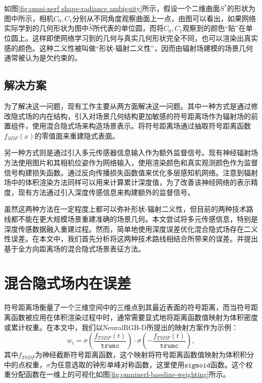 如图\ref{fig:omni-nerf shape-radiance ambiguity}所示，假设一个二维曲面$S^*$的形状为图中所示，相机$C_0, C_1$分别从不同角度观察曲面上一点，由图可以看出，如果网络实际学到的几何形状为图中$\hat{S}$所代表的单位圆，而将$C_0, C_1$观察到的颜色“贴”在单位圆上。这样即使网络学习到的几何与真实几何形状完全不同，也可以渲染出真实感的颜色。这种二义性被叫做“形状-辐射二义性”\cite{zhang_nerf_2020}，因而由辐射场建模的场景几何通常被认为是欠约束的。

\subsection{解决方案}

为了解决这一问题，现有工作主要从两方面解决这一问题。其中一种方式是通过修改隐式场的内在结构，引入对场景几何结构更加敏感的符号距离场作为辐射场的前置组件，使用混合隐式场来构造场景表示。将符号距离场通过抽取符号距离函数$f_{SDF}(x)$的零值面来重建隐式表面。

另一种方式则是通过引入多元传感器信息输入作为额外监督信号。现有神经辐射场方法使用图片和其相机位姿作为网络输入，使用渲染颜色和真实观测颜色作为监督信号构建损失函数。通过反向传播损失函数值来优化多层感知机网络。注意到辐射场中的体积渲染方法同样可以用来计算累计深度值，为了改善该神经网络的表示精度，现有方法通过引入深度传感信息来构建额外的监督信号\cite{deng_depth-supervised_2022, roessle_dense_2022, azinovic_neural_2022}。

虽然这两种方法在一定程度上都可以弥补形状-辐射二义性，但目前的两种技术路线都不能在更大规模场景重建准确的场景几何。本文尝试将多元传感信息，特别是深度传感数据融入重建过程。然而，简单地使用深度误差优化混合隐式场存在二义性误差。在本文中，我们首先分析将这两种技术路线相结合所带来的误差。并提出基于全方向距离场的混合隐式场景表征方法。

\section{混合隐式场内在误差}
符号距离场衡量了一个三维空间中的三维点到其最近表面的符号距离，而当符号距离函数被应用在体积渲染过程中时，通常需要显式地将距离函数值映射为体积密度或累计权重。在本文中，我们以NeuralRGB-D\cite{azinovic_neural_2022}所提出的映射方案作为示例：
\begin{equation}
    w_i = \sigma\left(\frac{f_{TSDF}(t)}{\mathtt{trunc}}\right)\cdot\sigma\left(-\frac{f_{TSDF}(t)}{\mathtt{trunc}}\right),
    \label{eq: omninerf-basedline-weighting}
\end{equation}
其中$f_{TSDF}$为神经截断符号距离函数，这个映射将符号距离函数值映射为体积积分中的点权重，$\sigma$为任意选取的钟形单峰对称函数，这里使用$\mathtt{sigmoid}$函数。这个权重分配函数在一维上的可视化如图\ref{fig:omninerf-baseline-weighting}所示。

